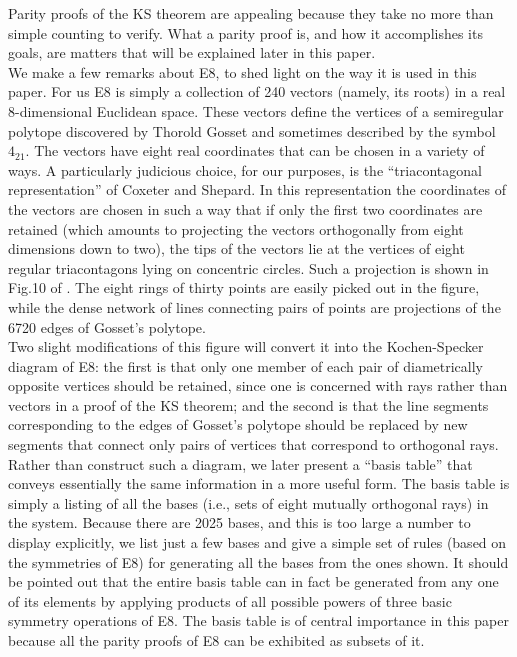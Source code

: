 Parity proofs of the KS theorem are appealing because they take no more than simple counting to verify. What a parity proof is, and how it accomplishes its goals, are matters that will be explained later in this paper.\\

We make a few remarks about E8, to shed light on the way it is used in this paper. For us E8 is simply a collection of 240 vectors (namely, its roots) in a real 8-dimensional Euclidean space. These vectors define the vertices of a semiregular polytope discovered by Thorold Gosset\cite{coxeter} and sometimes described by the symbol $4_{21}$. The vectors have eight real coordinates that can be chosen in a variety of ways. A particularly judicious choice, for our purposes, is the ``triacontagonal representation'' of Coxeter and Shepard\cite{leonardo}. In this representation the coordinates of the vectors are chosen in such a way that if only the first two coordinates are retained (which amounts to projecting the vectors orthogonally from eight dimensions down to two), the tips of the vectors lie at the vertices of eight regular triacontagons lying on concentric circles. Such a projection is shown in Fig.10 of \cite{leonardo}. The eight rings of thirty points are easily picked out in the figure, while the dense network of lines connecting pairs of points are projections of the 6720 edges of Gosset's polytope.\\

Two slight modifications of this figure will convert it into the Kochen-Specker diagram of E8: the first is that only one member of each pair of diametrically opposite vertices should be retained, since one is concerned with rays rather than vectors in a proof of the KS theorem; and the second is that the line segments corresponding to the edges of Gosset's polytope should be replaced by new segments that connect only pairs of vertices that correspond to orthogonal rays. Rather than construct such a diagram, we later present a ``basis table'' that conveys essentially the same information in a more useful form. The basis table is simply a listing of all the bases (i.e., sets of eight mutually orthogonal rays) in the system. Because there are 2025 bases, and this is too large a number to display explicitly, we list just a few bases and give a simple set of rules (based on the symmetries of E8) for generating all the bases from the ones shown. It should be pointed out that the entire basis table can in fact be generated from any one of its elements by applying products of all possible powers of three basic symmetry operations of E8. The basis table is of central importance in this paper because all the parity proofs of E8 can be exhibited as subsets of it.\\

